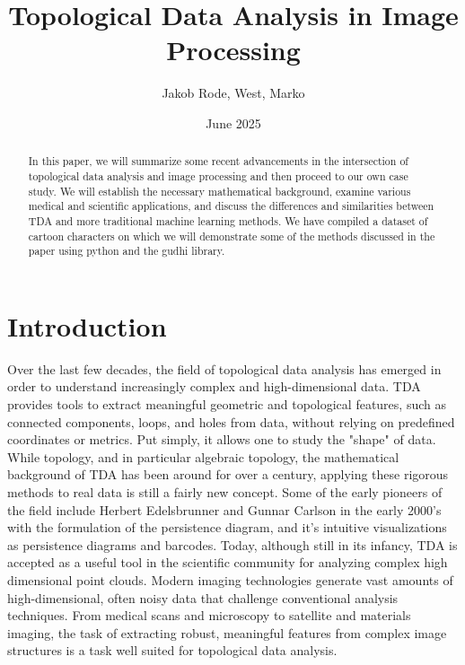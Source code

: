 \documentclass[12pt]{exam}
\title{Topological Data Analysis in Image Processing}
\author{Jakob Rode, West, Marko}
\date{June 2025}
\begin{document}
\maketitle



\begin{abstract}
\noindent   

In this paper, we will summarize some recent advancements in the intersection of topological data analysis and image processing and then proceed to our own case study. We will establish the necessary mathematical background, examine various medical and scientific applications, and discuss the differences and similarities between TDA and more traditional machine learning methods. We have compiled a dataset of cartoon characters on which we will demonstrate some of the methods discussed in the paper using python and the gudhi library.
\end{abstract}
\newpage

\section{Introduction}

Over the last few decades, the field of topological data analysis has emerged in order to understand increasingly complex and high-dimensional data. TDA provides tools to extract meaningful geometric and topological features, such as connected components, loops, and holes from data, without relying on predefined coordinates or metrics. Put simply, it allows one to study the "shape" of data.  \\

While topology, and in particular algebraic topology, the mathematical background of TDA has been around for over a century, applying these rigorous methods to real data is still a fairly new concept. Some of the early pioneers of the field include Herbert Edelsbrunner and Gunnar Carlson in the early 2000's with the formulation of the persistence diagram, and it's intuitive visualizations as persistence diagrams and barcodes. Today, although still in its infancy, TDA is accepted as a useful tool in the scientific community for analyzing complex high dimensional point clouds. Modern imaging technologies generate vast amounts of high-dimensional, often noisy data that challenge conventional analysis techniques. From medical scans and microscopy to satellite and materials imaging, the task of extracting robust, meaningful features from complex image structures is a task well suited for topological data analysis. 
\end{document}
